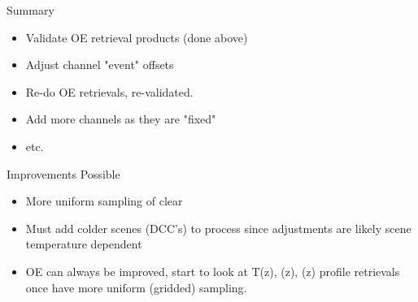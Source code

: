 \documentclass[10pt,t]{beamer}
\begin{document}
\begin{frame}[label={sec:orgbee904e}]{Summary}
\begin{itemize}
\item Validate OE retrieval products (done above)
\item Adjust channel "event" offsets
\item Re-do OE retrievals, re-validated.
\item Add more channels as they are "fixed"
\item etc.
\end{itemize}

\begin{block}{Improvements Possible}
\begin{itemize}
\item More uniform sampling of clear
\item Must add colder scenes (DCC's) to process since adjustments are likely scene temperature dependent
\item OE can always be improved, start to look at T(z), \water(z), \ozone(z) profile retrievals once have more uniform (gridded) sampling.
\end{itemize}
\end{block}
\end{frame}
\end{document}
